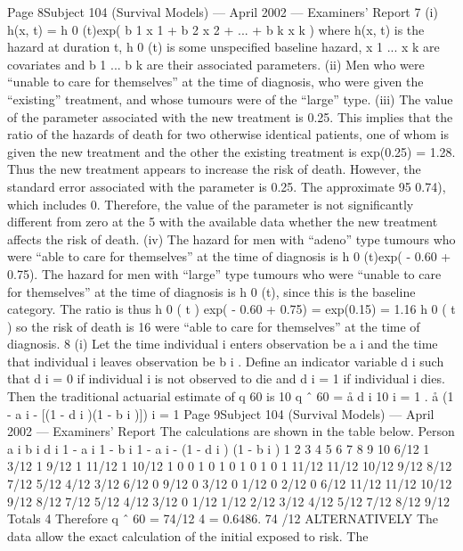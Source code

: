 \documentclass[a4paper,12pt]{article}
\begin{document}
\begin{enumerate}
Page 8Subject 104 (Survival Models) — April 2002 — Examiners’ Report
7
(i) h(x, t) = h 0 (t)exp( b 1 x 1 + b 2 x 2 + ... + b k x k )
where h(x, t) is the hazard at duration t, h 0 (t) is some unspecified baseline
hazard, x 1 ... x k are covariates and b 1 ... b k are their associated parameters.
(ii) Men who were “unable to care for themselves” at the time of diagnosis, who
were given the “existing” treatment, and whose tumours were of the “large”
type.
(iii) The value of the parameter associated with the new treatment is 0.25. This
implies that the ratio of the hazards of death for two otherwise identical
patients, one of whom is given the new treatment and the other the existing
treatment is exp(0.25) = 1.28. Thus the new treatment appears to increase the
risk of death.
However, the standard error associated with the parameter is 0.25. The
approximate 95%
0.74), which includes 0. Therefore, the value of the parameter is not
significantly different from zero at the 5%
with the available data whether the new treatment affects the risk of death.
(iv)
The hazard for men with “adeno” type tumours who were “able to care for
themselves” at the time of diagnosis is h 0 (t)exp( - 0.60 + 0.75).
The hazard for men with “large” type tumours who were “unable to care for
themselves” at the time of diagnosis is h 0 (t), since this is the baseline category.
The ratio is thus
h 0 ( t ) exp( - 0.60 + 0.75)
= exp(0.15) = 1.16
h 0 ( t )
so the risk of death is 16%
were “able to care for themselves” at the time of diagnosis.
8
(i)
Let the time individual i enters observation be a i and the time that individual i
leaves observation be b i . Define an indicator variable d i such that d i = 0 if
individual i is not observed to die and d i = 1 if individual i dies. Then the
traditional actuarial estimate of q 60 is
10
q ˆ 60 =
å d i
10
i = 1
.
å (1 - a i - [(1 - d i )(1 - b i )])
i = 1
Page 9Subject 104 (Survival Models) — April 2002 — Examiners’ Report
The calculations are shown in the table below.
Person a i b i d i 1 - a i 1 - b i 1 - a i - (1 - d i ) (1 - b i )
1
2
3
4
5
6
7
8
9
10 6/12
1
3/12
1
9/12
1
11/12
1
10/12
1 0
0
1
0
1
0
1
0
1
0 1
11/12
11/12
10/12
9/12
8/12
7/12
5/12
4/12
3/12 6/12
0
9/12
0
3/12
0
1/12
0
2/12
0 6/12
11/12
11/12
10/12
9/12
8/12
7/12
5/12
4/12
3/12
0
1/12
1/12
2/12
3/12
4/12
5/12
7/12
8/12
9/12
Totals
4
Therefore q ˆ 60 =
74/12
4
= 0.6486.
74 /12
ALTERNATIVELY
The data allow the exact calculation of the initial exposed to risk. The

\end{enumerate}
\end{document}
